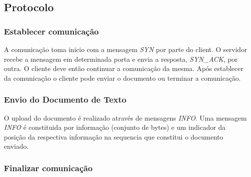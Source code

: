 \documentclass{llncs}
\begin{document}
\subsection{Protocolo}
\subsubsection{Establecer comunicação}
A comunicação toma inicio com a mensagem \textit{SYN} por parte do client. O servidor recebe a mensagem em determinada porta e envia a resposta, \textit{SYN\_ACK}, por outra. O cliente deve então continuar a comunicação da mesma. Após establecer da comunicação o cliente pode enviar o documento ou terminar a comunicação.
\subsubsection{Envio do Documento de Texto}
O upload do documento é realizado através de mensagens \textit{INFO}. Uma mensagem \textit{INFO} é constituida por informação (conjunto de bytes) e um indicador da posição da respectiva informação na sequencia que constitui o documento enviado.

\subsubsection{Finalizar comunicação}

\end{document}
